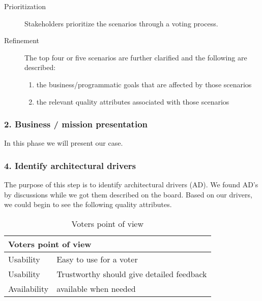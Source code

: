 \begin{description}
    \item [Prioritization] 
  Stakeholders prioritize the scenarios through a voting process. 
    
    \item [Refinement]
        The top four or five scenarios are further clarified and the following are described:
        \begin{enumerate}
            \item the business/programmatic goals that are affected by those scenarios
            \item the relevant quality attributes associated with those scenarios   
        \end{enumerate}

   

\end{description}




\subsubsection{2. Business / mission presentation}
In this phase we will present our case.
 

\subsubsection{4. Identify architectural drivers}
The purpose of this step is to identify architectural drivers (AD). We found AD's by discussions while we got them described on the board. Based on our drivers, we could begin to see the following quality attributes.\\


\begin{table}[H]
\centering
\begin{tabular}{|l|l|}
\hline
\multicolumn{2}{|l|}{Voters point of view}                \\ \hline
Usability    & Easy to use for a voter                   \\ \hline
Usability    & Trustworthy should give detailed feedback \\ \hline
Availability & available when needed                     \\ \hline
\end{tabular}
\caption{Voters point of view}
\label{my-label}
\end{table}


